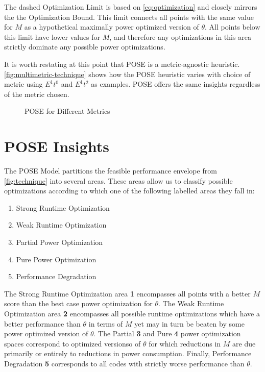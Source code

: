 The dashed Optimization Limit is based on \autoref{eq:optimization} and closely mirrors the the Optimization Bound.
This limit connects all points with the same value for $M$ as a hypothetical maximally power optimized version of $\theta$. 
All points below this limit have lower values for $M$, and therefore any optimizations in this area strictly dominate any possible power optimizations. 

It is worth restating at this point that POSE is a metric-agnostic heuristic. \autoref{fig:multimetric-technique} shows how the POSE heuristic varies with choice of metric using $E^1t^0$ and $E^1t^2$ as examples. POSE offers the same insights regardless of the metric chosen.

\begin{figure}
\centering

\caption{POSE for Different Metrics}
\label{fig:multimetric-technique}
\end{figure}


\section{POSE Insights}
\label{sec:insights}
The POSE Model partitions the feasible performance envelope from \autoref{fig:technique} into several areas.
These areas allow us to classify possible optimizations according to which one of the following labelled areas they fall in:

\begin{enumerate}
\item Strong Runtime Optimization
\item Weak Runtime Optimization
\item Partial Power Optimization
\item Pure Power Optimization
\item Performance Degradation
\end{enumerate}

The Strong Runtime Optimization area \textbf{1} encompasses all points with a better $M$ score than the best case power optimization for $\theta$. The Weak Runtime Optimization area \textbf{2} encompasses all possible runtime optimizations which have a better performance than $\theta$ in terms of $M$ yet may in turn be beaten by some power optimized version of $\theta$. The Partial \textbf{3} and Pure \textbf{4} power optimization spaces correspond to optimized versionso of $\theta$ for which reductions in $M$ are due primarily or entirely to reductions in power consumption.
Finally, Performance Degradation \textbf{5} corresponds to all codes with strictly worse performance than $\theta$.


